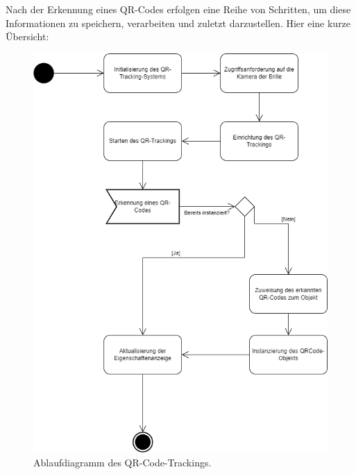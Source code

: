 Nach der Erkennung eines QR-Codes erfolgen eine Reihe von Schritten, um diese Informationen zu speichern, verarbeiten
und zuletzt darzustellen.
Hier eine kurze Übersicht:

\begin{figure}[H]
\centering
\includegraphics[scale=0.5, angle=0]{images/QRAblauf}
\caption{Ablaufdiagramm des QR-Code-Trackings.}
\label{fig:qrtracking}
\end{figure}

